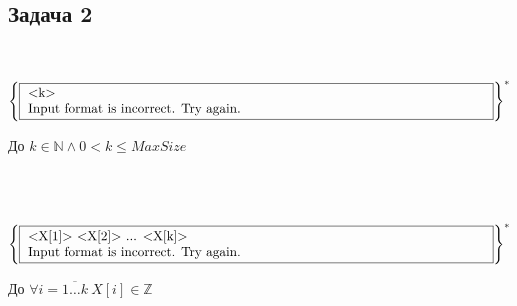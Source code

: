 \subsection*{Задача 2}
\\[0.3cm]
\noindent
\begin{minipage}{0.4\textwidth}
    \(\left\{
         \fbox{
            \parbox{\textwidth} {
                \text{<k>}\\
                \text{Input format is incorrect. Try again.}  
            }
        }
    \right\}^{*}\) 
\end{minipage}%
\hfill
\begin{minipage}{0.5\textwidth}
    До \(k \in \mathbb{N} \land 0 < k \leq MaxSize\)
\end{minipage}%
\\[0.3cm]
\\[0.3cm]
\noindent
\begin{minipage}{0.4\textwidth}
    \(\left\{
        \fbox{
            \parbox{\textwidth} {
                \text{<X[1]> <X[2]> ... <X[k]>}\\
                \text{Input format is incorrect. Try again.}  
            }
        }
    \right\}^{*}\) 
\end{minipage}%
\hfill
\begin{minipage}{0.5\textwidth}
    До \(\forall i = \overline{1 \dots k}\ X[i] \in \mathbb{Z}\) 
\end{minipage}%
\\[0.3cm]
